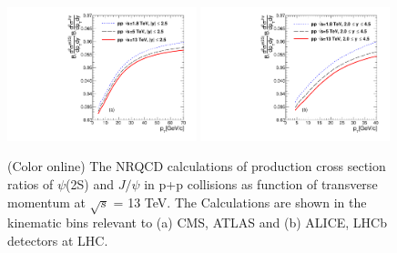\documentclass[aps,prc,preprint,superscriptaddress,showpacs,showkeys,amsmath]{revtex4-1}
\begin{document}
\begin{figure}
\includegraphics[width=0.49\textwidth]{Figures/Predict/Fig_ATLAS_D2NDPtDy_DirectPsi_DirectJPsi_Y2525.pdf}
\includegraphics[width=0.49\textwidth]{Figures/Predict/Fig_ALICE_2045_RootS5TeV_Psi_JPsi_Pt.pdf}
\caption{(Color online) The NRQCD calculations of production cross section ratios of $\psi$(2S) and $J/\psi$
  in p+p collisions as function of transverse momentum at $\sqrt{s}$ = 13 TeV. The Calculations are shown in 
  the kinematic bins relevant to (a) CMS, ATLAS and (b) ALICE, LHCb detectors at LHC. 
}
\label{Fig:RatioSigma_13TeV}
\end{figure}














\end{document}
